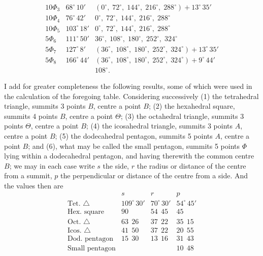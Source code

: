 \documentclass[11pt,a4paper]{article}
\begin{document}
\[\begin{array}{l|ll}
10\Phi_{3} & 68^{\circ}\,10' & (0^{\circ},\; 72^{\circ},\; 144^{\circ},\; 216^{\circ},\; 288^{\circ}) + 13^{\circ}\,35'\\
10\Phi_{4} & 76^{\circ}\,42' & 0^{\circ},\; 72^{\circ},\; 144^{\circ},\; 216^{\circ},\; 288^{\circ}\\
10\Phi_{5} & 103^{\circ}\,18' & 0^{\circ},\; 72^{\circ},\; 144^{\circ},\; 216^{\circ},\; 288^{\circ}\\
5\Phi_{6} & 111^{\circ}\,50' & 36^{\circ},\; 108^{\circ},\; 180^{\circ},\; 252^{\circ},\; 324^{\circ}\\
5\Phi_{7} & 127^{\circ}\,8' & (36^{\circ},\; 108^{\circ},\; 180^{\circ},\; 252^{\circ},\; 324^{\circ}) + 13^{\circ}\,35'\\
5\Phi_{8} & 166^{\circ}\,44' & (36^{\circ},\; 108^{\circ},\; 180^{\circ},\; 252^{\circ},\; 324^{\circ}) + 9^{\circ}\,44'\\
& & 108^{\circ}.
\end{array}
\]

\newpage


\noindent I add for greater completeness the following results, some of which were used in the calculation of the foregoing table. Considering successively (1) the tetrahedral triangle, summits 3 points $B$, centre a point $B$; (2) the hexahedral square, summits 4 points $B$, centre a point $\Theta$; (3) the octahedral triangle, summits 3 points $\Theta$, centre a point $B$; (4) the icosahedral triangle, summits 3 points $A$, centre a point $B$; (5) the dodecahedral pentagon, summits 5 points $A$, centre a point $B$; and (6), what may be called the small pentagon, summits 5 points $\Phi$ lying within a dodecahedral pentagon, and having therewith the common centre $B$; we may in each case write $s$ the side, $r$ the radius or distance of the centre from a summit, $p$ the perpendicular or distance of the centre from a side. And the values then are
\[
\begin{array}{l|ccc}
 & s & r & p\\
\hline
\text{Tet.\ }\triangle & 109^{\circ}\,30' & 70^{\circ}\,30' & 54^{\circ}\,45'\\
\text{Hex.\ square} & 90 & 54\;\,45 & 45\\
\text{Oct.\ }\triangle & 63\;\,26 & 37\;\,22 & 35\;\,15\\
\text{Icos.\ }\triangle & 41\;\,50 & 37\;\,22 & 20\;\,55\\
\text{Dod.\ pentagon} & 15\;\,30 & 13\;\,16 & 31\;\,43\\
\text{Small pentagon} &      &      & 10\;\,48
\end{array}
\]
\end{document}
